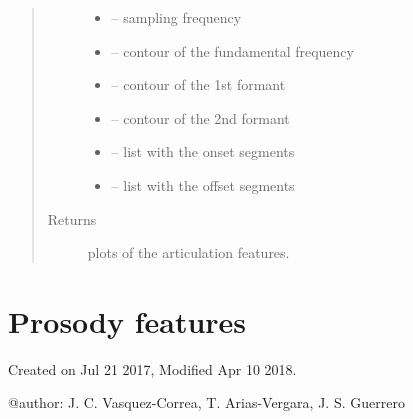 \documentclass[letterpaper,10pt,english]{sphinxmanual}
\begin{document}
\begin{fulllineitems}
\begin{fulllineitems}
\begin{quote}
\begin{description}
\begin{itemize}
\item {} 
 -- sampling frequency

\item {} 
 -- contour of the fundamental frequency

\item {} 
 -- contour of the 1st formant

\item {} 
 -- contour of the 2nd formant

\item {} 
 -- list with the onset segments

\item {} 
 -- list with the offset segments

\end{itemize}

\item[{Returns}] \leavevmode
plots of the articulation features.

\end{description}\end{quote}

\end{fulllineitems}


\end{fulllineitems}



\chapter{Prosody features}
\label{\detokenize{Prosody::doc}}\label{\detokenize{Prosody:prosody-features}}\label{\detokenize{Prosody:module-prosody}}
Created on Jul 21 2017, Modified Apr 10 2018.

@author: J. C. Vasquez-Correa, T. Arias-Vergara, J. S. Guerrero
\end{document}
